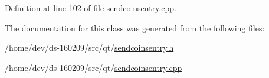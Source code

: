 Definition at line 102 of file sendcoinsentry.\+cpp.



The documentation for this class was generated from the following files\+:\begin{DoxyCompactItemize}
\item 
/home/dev/ds-\/160209/src/qt/\hyperlink{sendcoinsentry_8h}{sendcoinsentry.\+h}\item 
/home/dev/ds-\/160209/src/qt/\hyperlink{sendcoinsentry_8cpp}{sendcoinsentry.\+cpp}\end{DoxyCompactItemize}
